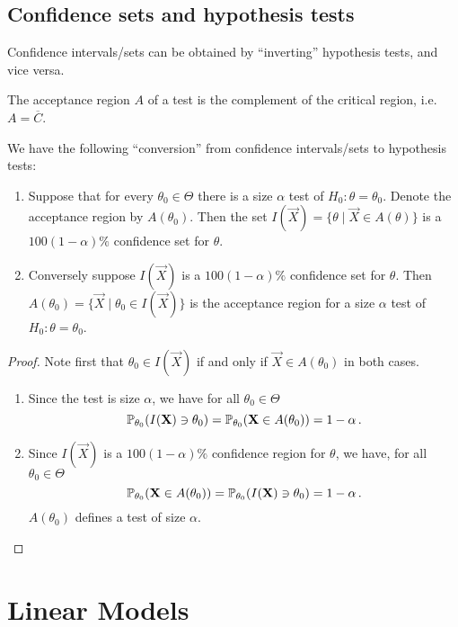 \section{Confidence sets and hypothesis tests}
Confidence intervals/sets can be obtained by ``inverting'' hypothesis tests, and vice versa.

\begin{definition}
The acceptance region $A$ of a test is the complement of the critical region, i.e. $A = \overline{C}$.
\end{definition}

\begin{theorem}
We have the following ``conversion'' from confidence intervals/sets to hypothesis tests:
\begin{enumerate}
\item   Suppose that for every $\theta_0 \in \Theta$ there is a size $\alpha$ test of $H_0 : \theta = \theta_0$.
Denote the acceptance region by $A(\theta_0)$.
Then the set $I(\vec{X}) = \{ \theta \mid \vec{X} \in A(\theta) \}$ is a $100(1 - \alpha)\%$ confidence set for $\theta$.
\item Conversely suppose $I(\vec{X})$ is a $100(1-\alpha)\%$ confidence set for $\theta$.
Then $A(\theta_0) = \{ \vec{X} \mid \theta_0 \in I(\vec{X}) \}$ is the acceptance region for a size $\alpha$ test of $H_0 : \theta = \theta_0$.
\end{enumerate}
\end{theorem}

\begin{proof}
  Note first that $\theta_0 \in I(\vec{X})$ if and only if $\vec{X} \in A(\theta_0)$ in both cases.
\begin{enumerate}
\item Since the test is size $\alpha$, we have for all $\theta_0 \in \Theta$
\[
\mathbb{P}_{\theta_0} ( I (\mathbf{X}) \ni \theta_0 ) = \mathbb{P}_{\theta_0} (\mathbf{X} \in A(\theta_0)) = 1 - \alpha \, {.}
\]
\item Since $I(\vec{X})$ is a $100(1-\alpha)\%$ confidence region for $\theta$, we have, for all $\theta_0 \in \Theta$
\[
\mathbb{P}_{\theta_0}( \mathbf{X} \in A(\theta_0) ) = \mathbb{P}_{\theta_0} ( I(\mathbf{X}) \ni \theta_0 ) = 1 - \alpha \, {.}
\]
$A(\theta_0)$ defines a test of size $\alpha$.
\end{enumerate}
\end{proof}

\chapter{Linear Models}

